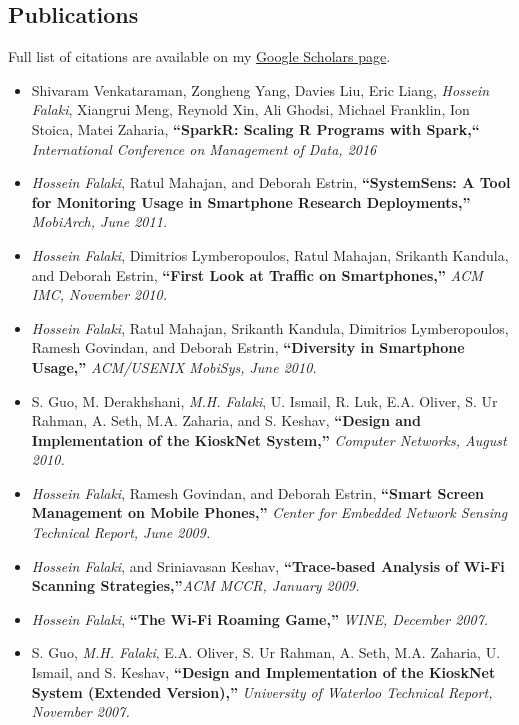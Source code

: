 \documentclass[margin]{res}
\begin{document}
\begin{resume}
\section{\sc \large Publications}
Full list of citations are available on my \href{https://scholar.google.com/citations?user=wRw-e8EAAAAJ}{Google Scholars page}.
\begin{itemize}

\item Shivaram Venkataraman, Zongheng Yang, Davies Liu, Eric Liang, \emph{Hossein Falaki}, Xiangrui Meng, Reynold Xin, Ali Ghodsi, Michael Franklin, Ion Stoica, Matei Zaharia, 
{\bf ``SparkR: Scaling R Programs with Spark,``}
\emph{International Conference on Management of Data, 2016}

\item \emph{Hossein Falaki}, Ratul Mahajan, and Deborah Estrin, 
{\bf ``SystemSens: A Tool for Monitoring Usage in Smartphone Research
Deployments,''}
\emph{MobiArch, June 2011.}


\item \emph{Hossein Falaki}, Dimitrios Lymberopoulos, Ratul Mahajan, 
Srikanth Kandula, and Deborah Estrin, 
{\bf ``First Look at Traffic on Smartphones,''}
\emph{ACM IMC, November 2010.}


\item \emph{Hossein Falaki}, Ratul Mahajan, Srikanth Kandula,
Dimitrios Lymberopoulos, Ramesh Govindan, and Deborah Estrin, 
{\bf ``Diversity in Smartphone Usage,''}
\emph{ACM/USENIX MobiSys, June 2010.}


\item S. Guo, M. Derakhshani, \emph{M.H. Falaki}, U. Ismail, R. Luk, E.A. Oliver, S. Ur Rahman, A. Seth, M.A. Zaharia, and S. Keshav, 
{\bf ``Design and Implementation of the KioskNet System,''} 
\emph{Computer Networks, August 2010.}


\item \emph{Hossein Falaki}, Ramesh Govindan, and Deborah Estrin, 
{\bf ``Smart Screen Management on Mobile Phones,''}
\emph{Center for Embedded Network Sensing Technical Report, 
June 2009.}

\item \emph{Hossein Falaki}, and Sriniavasan Keshav, {\bf ``Trace-based
Analysis of Wi-Fi Scanning Strategies,''}\emph{ACM MCCR, January 2009.}

\item \emph{Hossein Falaki}, {\bf ``The Wi-Fi Roaming Game,''}
\emph{WINE, December 2007.}


\item S. Guo, \emph{M.H. Falaki}, E.A. Oliver, S. Ur Rahman, A. Seth, M.A. Zaharia, U. Ismail, and S. Keshav, 
{\bf ``Design and Implementation of the KioskNet System (Extended Version),''} 
\emph{University of Waterloo Technical Report, November 2007.}


\end{itemize}
\end{resume}
\end{document}
